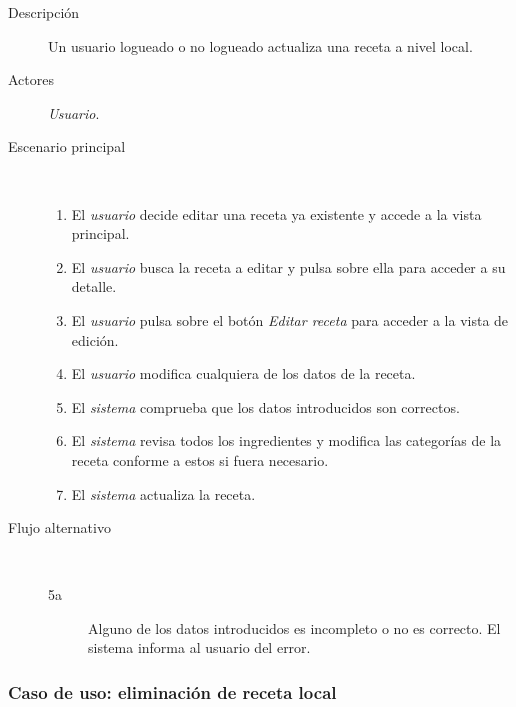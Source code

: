 \begin{description}
\item[Descripción] Un usuario logueado o no logueado actualiza una receta a nivel
local.
\item[Actores] \textit{Usuario}.
\item[Escenario principal] $\quad$
  \begin{enumerate}
  \item El \textit{usuario} decide editar una receta ya existente y accede a la
  vista principal.
  \item El \textit{usuario} busca la receta a editar y pulsa sobre ella para
  acceder a su detalle.
  \item El \textit{usuario} pulsa sobre el botón \textit{Editar receta} para
  acceder a la vista de edición.
  \item El \textit{usuario} modifica cualquiera de los datos de la receta.
  \item El \textit{sistema} comprueba que los datos introducidos son correctos.
  \item El \textit{sistema} revisa todos los ingredientes y modifica las
  categorías de la receta conforme a estos si fuera necesario.
  \item El \textit{sistema} actualiza la receta.
  \end{enumerate}
\item[Flujo alternativo] $\quad$
  \begin{description}
  \item[5a] Alguno de los datos introducidos es incompleto o no es correcto. El
    sistema informa al usuario del error.
  \end{description}
\end{description}


\subsubsection{Caso de uso: eliminación de receta local}

